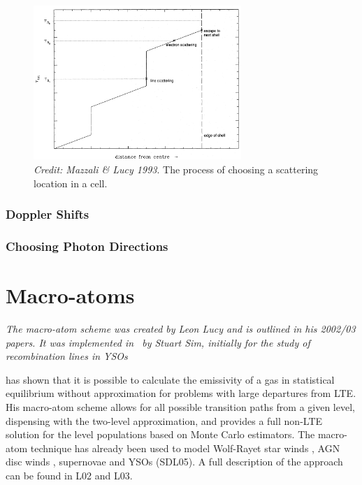 \begin{figure}
\centering
\includegraphics[width=0.7\textwidth]{figures/03-radtrans/tau_scat.png}
\caption
{
{\sl Credit: Mazzali \& Lucy 1993}. 
The process of choosing a scattering location in a cell.
} 
\label{fig:scatter_ml93}
\end{figure}

\subsubsection{Doppler Shifts}




\subsubsection{Choosing Photon Directions}







\section{Macro-atoms}

{\sl The macro-atom scheme was created by Leon Lucy and is outlined in 
his 2002/03 papers. It was implemented in \py\ by Stuart Sim, initially
for the study of recombination lines in YSOs \citep{simmacro2005}
}

\cite{lucy2002, lucy2003}
has shown that it is possible to calculate the emissivity of a gas in
statistical equilibrium without approximation for problems with large departures
from LTE.
His macro-atom scheme allows for all possible transition paths from a given level,
dispensing with the two-level approximation, and
provides a full non-LTE solution
for the level populations based on Monte Carlo estimators. The macro-atom
technique has already been used to model Wolf-Rayet star
winds \citep{sim2004}, AGN disc winds \citep{simlong2008, tatum2012},
supernovae \citep{kromersim2009, kerzendorfsim} and YSOs (SDL05). A full 
description of the approach can be found in L02 and L03. 

